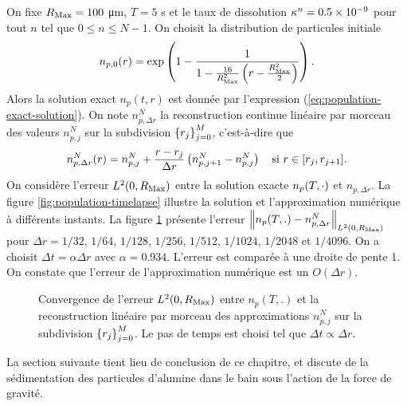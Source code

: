 On fixe $R_\mathrm{Max} = \num{100}$ \si{\micro\meter}, $T = 5$ \si{\second} et
le taux de dissolution
$\kappa^n = \num{0.5e-9}$ pour tout $n$ tel que $0\leq n\leq
N-1$. On choisit la distribution de particules initiale
\begin{equation}\label{eq:population-test-ic}
  n_{p,0}(r) = \exp\left( 1 - \frac{1}{1 - \frac{16}{R_\mathrm{Max}^2}\left( r - \frac{R_\mathrm{Max}^2}{2} \right)} \right).
\end{equation}
Alors la solution exact $n_p(t, r)$ est donnée par l'expression
(\ref{eq:population-exact-solution}). On note $n_{p,\Delta r}^N$ la
reconstruction continue linéaire par morceau des valeurs $n_{p,j}^N$
sur la subdivision $\left\{ r_j \right\}_{j=0}^M$, c'est-à-dire que
\begin{equation}
  n_{p,\Delta r}^N(r) = n_{p,j}^N + \frac{r - r_j}{\Delta
    r}\left( n_{p,j+1}^N - n_{p,j}^N \right)\quad \text{si } r\in[r_j, r_{j+1}].
\end{equation}
On considère l'erreur $L^2(0,R_\mathrm{Max})$ entre la solution exacte
$n_p(T, \cdot)$ et $n_{p,\Delta r}$. La figure
\ref{fig:population-timelapse} illustre la solution et l'approximation
numérique à différents instants. La figure
\ref{fig:population-convergence} présente l'erreur $\left\lVert n_p(T, .) -
  n_{p,\Delta r}^N \right\rVert_{L^2(0,R_\mathrm{Max})}$ pour $\Delta r = 1/32$, $1/64$,
$1/128$, $1/256$, $1/512$, $1/1024$, $1/2048$ et $1/4096$. On a
choisit $\Delta t = \alpha\Delta r$ avec $\alpha =
\num{0.934}$. L'erreur est comparée à une droite de pente 1. On
constate que l'erreur de l'approximation numérique est un $O(\Delta
r)$.

\begin{figure}[h!]
  \begin{center}
    
    \caption{Convergence de l'erreur $L^2(0, R_\mathrm{Max})$ entre $n_p(T, .)$
      et la reconstruction linéaire par morceau des approximations
      $n_{p,j}^N$ sur la subdivision $\left\{ r_j \right\}_{j = 0}^M$. Le pas
      de temps est choisi tel que $\Delta t \propto \Delta r$.}
    \label{fig:population-convergence}
  \end{center}
\end{figure}

La section suivante tient lieu de conclusion de ce chapitre, et discute
de la sédimentation des particules d'alumine dans le bain sous
l'action de la force de gravité.
